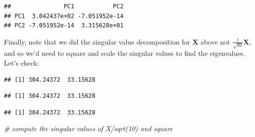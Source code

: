 \documentclass[
]{book}
\newenvironment{Shaded}{\begin{snugshade}}{\end{snugshade}}
\newcommand{\CommentTok}[1]{\textcolor[rgb]{0.56,0.35,0.01}{\textit{#1}}}
\newcommand{\DecValTok}[1]{\textcolor[rgb]{0.00,0.00,0.81}{#1}}
\newcommand{\FunctionTok}[1]{\textcolor[rgb]{0.13,0.29,0.53}{\textbf{#1}}}
\newcommand{\NormalTok}[1]{#1}
\newcommand{\SpecialCharTok}[1]{\textcolor[rgb]{0.81,0.36,0.00}{\textbf{#1}}}
\theoremstyle{definition}
\theoremstyle{definition}
\theoremstyle{definition}
\theoremstyle{definition}
\theoremstyle{remark}
\begin{document}
\begin{verbatim}
##               PC1           PC2
## PC1  3.042437e+02 -7.051952e-14
## PC2 -7.051952e-14  3.315628e+01
\end{verbatim}

Finally, note that we did the singular value decomposition for \(\mathbf X\) above not \(\frac{1}{\sqrt{10}}\mathbf X\), and so we'd need to square and scale the singular values to find the eigenvalues. Let's check:

\begin{Shaded}
\end{Shaded}

\begin{verbatim}
## [1] 304.24372  33.15628
\end{verbatim}

\begin{Shaded}
\end{Shaded}

\begin{verbatim}
## [1] 304.24372  33.15628
\end{verbatim}

\begin{Shaded}
\end{Shaded}

\begin{verbatim}
## [1] 304.24372  33.15628
\end{verbatim}

\begin{Shaded}
\begin{Highlighting}[]
\CommentTok{\# compute the singular values of X/sqrt(10) and square}
\end{Highlighting}
\end{Shaded}
\end{document}
